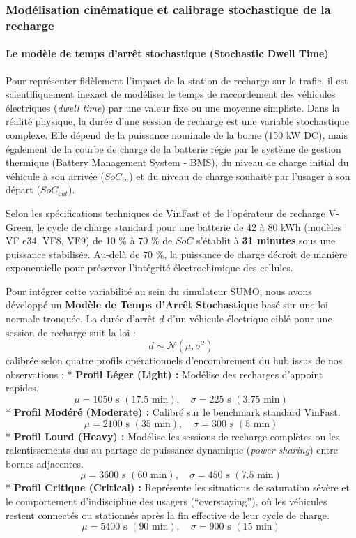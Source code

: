 \documentclass[10pt, a4paper]{article}
\begin{document}
\subsubsection{Modélisation cinématique et calibrage stochastique de la
recharge}\label{moduxe9lisation-cinuxe9matique-et-calibrage-stochastique-de-la-recharge}

\paragraph{Le modèle de temps d'arrêt stochastique (Stochastic Dwell
Time)}\label{le-moduxe8le-de-temps-darruxeat-stochastique-stochastic-dwell-time}

Pour représenter fidèlement l'impact de la station de recharge sur le
trafic, il est scientifiquement inexact de modéliser le temps de
raccordement des véhicules électriques (\emph{dwell time}) par une
valeur fixe ou une moyenne simpliste. Dans la réalité physique, la durée
d'une session de recharge est une variable stochastique complexe. Elle
dépend de la puissance nominale de la borne (150 kW DC), mais également
de la courbe de charge de la batterie régie par le système de gestion
thermique (Battery Management System - BMS), du niveau de charge initial
du véhicule à son arrivée (\(SoC_{in}\)) et du niveau de charge souhaité
par l'usager à son départ (\(SoC_{out}\)).

Selon les spécifications techniques de VinFast et de l'opérateur de
recharge V-Green, le cycle de charge standard pour une batterie de 42 à
80 kWh (modèles VF e34, VF8, VF9) de 10 \% à 70 \% de \(SoC\) s'établit
à \textbf{31 minutes} sous une puissance stabilisée. Au-delà de 70 \%,
la puissance de charge décroît de manière exponentielle pour préserver
l'intégrité électrochimique des cellules.

Pour intégrer cette variabilité au sein du simulateur SUMO, nous avons
développé un \textbf{Modèle de Temps d'Arrêt Stochastique} basé sur une
loi normale tronquée. La durée d'arrêt \(d\) d'un véhicule électrique
ciblé pour une session de recharge suit la loi :
\[d \sim \mathcal{N}(\mu, \sigma^2)\] calibrée selon quatre profils
opérationnels d'encombrement du hub issus de nos observations : *
\textbf{Profil Léger (Light) :} Modélise des recharges d'appoint
rapides.
\[\mu = 1050 \text{ s } (17.5 \text{ min}), \quad \sigma = 225 \text{ s } (3.75 \text{ min})\]
* \textbf{Profil Modéré (Moderate) :} Calibré sur le benchmark standard
VinFast.
\[\mu = 2100 \text{ s } (35 \text{ min}), \quad \sigma = 300 \text{ s } (5 \text{ min})\]
* \textbf{Profil Lourd (Heavy) :} Modélise les sessions de recharge
complètes ou les ralentissements dus au partage de puissance dynamique
(\emph{power-sharing}) entre bornes adjacentes.
\[\mu = 3600 \text{ s } (60 \text{ min}), \quad \sigma = 450 \text{ s } (7.5 \text{ min})\]
* \textbf{Profil Critique (Critical) :} Représente les situations de
saturation sévère et le comportement d'indiscipline des usagers
(``overstaying''), où les véhicules restent connectés ou stationnés
après la fin effective de leur cycle de charge.
\[\mu = 5400 \text{ s } (90 \text{ min}), \quad \sigma = 900 \text{ s } (15 \text{ min})\]
\end{document}
